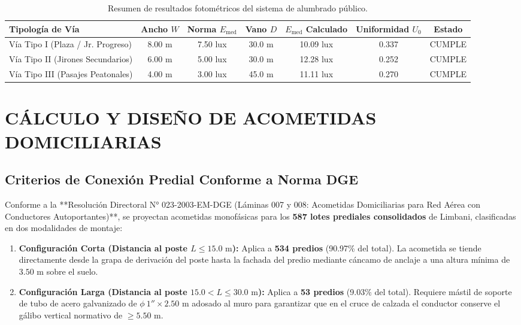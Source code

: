 \begin{table}[H]
\centering
\small
\begin{tabular}{|l|c|c|c|c|c|c|}
\hline
\textbf{Tipología de Vía} & \textbf{Ancho $W$} & \textbf{Norma $E_{\text{med}}$} & \textbf{Vano $D$} & \textbf{$E_{\text{med}}$ Calculado} & \textbf{Uniformidad $U_0$} & \textbf{Estado} \\
\hline
Vía Tipo I (Plaza / Jr. Progreso) & 8.00 m & 7.50 lux & 30.0 m & 10.09 lux & 0.337 & CUMPLE \\
Vía Tipo II (Jirones Secundarios) & 6.00 m & 5.00 lux & 30.0 m & 12.28 lux & 0.252 & CUMPLE \\
Vía Tipo III (Pasajes Peatonales) & 4.00 m & 3.00 lux & 45.0 m & 11.11 lux & 0.270 & CUMPLE \\
\hline
\end{tabular}
\caption{Resumen de resultados fotométricos del sistema de alumbrado público.}
\end{table}

\section{CÁLCULO Y DISEÑO DE ACOMETIDAS DOMICILIARIAS}

\subsection{Criterios de Conexión Predial Conforme a Norma DGE}
Conforme a la **Resolución Directoral N° 023-2003-EM-DGE (Láminas 007 y 008: Acometidas Domiciliarias para Red Aérea con Conductores Autoportantes)**, se proyectan acometidas monofásicas para los \textbf{587 lotes prediales consolidados} de Limbani, clasificadas en dos modalidades de montaje:
\begin{enumerate}
    \item \textbf{Configuración Corta (Distancia al poste $L \le 15.0\text{ m}$):} Aplica a \textbf{534 predios} (90.97\% del total). La acometida se tiende directamente desde la grapa de derivación del poste hasta la fachada del predio mediante cáncamo de anclaje a una altura mínima de $3.50\text{ m}$ sobre el suelo.
    \item \textbf{Configuración Larga (Distancia al poste $15.0 < L \le 30.0\text{ m}$):} Aplica a \textbf{53 predios} (9.03\% del total). Requiere mástil de soporte de tubo de acero galvanizado de $\phi\ 1'' \times 2.50\text{ m}$ adosado al muro para garantizar que en el cruce de calzada el conductor conserve el gálibo vertical normativo de $\ge 5.50\text{ m}$.
\end{enumerate}


